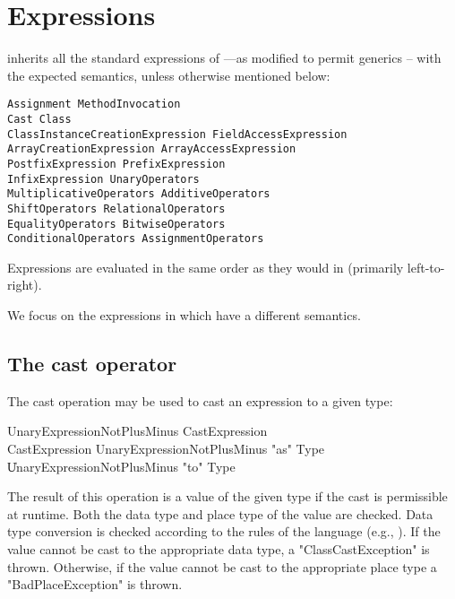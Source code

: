 \section{Expressions}\label{XtenExpressions}

{}\Xten{} inherits all the standard expressions of \Java{}
\cite[\S~15]{jls2}---as modified to permit generics \cite{gjspec} --
with the expected semantics, unless otherwise mentioned below:

\begin{verbatim}
Assignment MethodInvocation 
Cast Class
ClassInstanceCreationExpression FieldAccessExpression   
ArrayCreationExpression ArrayAccessExpression
PostfixExpression PrefixExpression 
InfixExpression UnaryOperators
MultiplicativeOperators AdditiveOperators 
ShiftOperators RelationalOperators  
EqualityOperators BitwiseOperators
ConditionalOperators AssignmentOperators
\end{verbatim}

Expressions are evaluated in the same order as they would in \java{}
(primarily
left-to-right).\label{FieldAccess}\label{ClassCreation}\label{MethodInvocation}

We focus on the expressions in \Xten{} which have a different
semantics.

\subsection{The cast operator}\label{ClassCast}

The cast operation may be used to cast an expression to a given type:
\begin{grammar}
UnaryExpressionNotPlusMinus \: CastExpression \\
CastExpression \: UnaryExpressionNotPlusMinus \xcd"as" Type \\
\| UnaryExpressionNotPlusMinus \xcd"to" Type \\
\end{grammar}

The result of this operation is a value of the given type if the cast
is permissible at runtime. Both the data type and place type of the
value are checked. Data type conversion is checked according to the
rules of the \java{} language (e.g., \cite[\S 5.5]{jls2}). If the
value cannot be cast to the appropriate data type, a
\xcd"ClassCastException"
is thrown. Otherwise, if the value cannot be cast to the
appropriate place type a \xcd"BadPlaceException" is thrown. 

